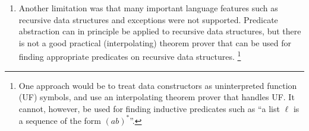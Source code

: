 \begin{enumerate}
%


%
%

\item Another limitation was that many important language
  features such as recursive data structures and exceptions were not supported.
  Predicate abstraction can in principle be applied to recursive data structures, but there is not a good practical (interpolating) theorem prover
 that can be used for finding appropriate predicates on
 recursive data structures.%
\footnote{One approach would be to treat data constructors as uninterpreted
  function (UF) symbols, and use an interpolating theorem prover that handles
  UF. It cannot, however, be used for finding inductive predicates such as
  ``a list \(\ell\) is a sequence of the form \((ab)^*\)''.}


\end{enumerate}
